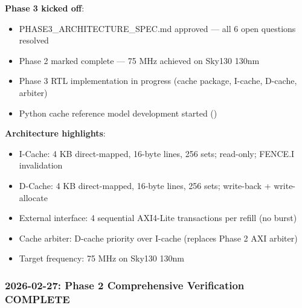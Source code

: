 \begin{record}

\textbf{Phase 3 kicked off}:

\begin{itemize}
\tightlist
\item
  \ok{} PHASE3\_\allowbreak{}ARCHITECTURE\_\allowbreak{}SPEC.md approved
  --- all 6 open questions resolved
\item
  \ok{} Phase 2 marked complete --- 75 MHz achieved on Sky130 130nm
\item
  \wip{} Phase 3 RTL implementation in progress (cache package, I-cache,
  D-cache, arbiter)
\item
  \wip{} Python cache reference model development started
  ()
\end{itemize}

\textbf{Architecture highlights}:

\begin{itemize}
\tightlist
\item
  I-Cache: 4 KB direct-mapped, 16-byte lines, 256 sets; read-only;
  FENCE.I invalidation
\item
  D-Cache: 4 KB direct-mapped, 16-byte lines, 256 sets; write-back +
  write-allocate
\item
  External interface: 4 sequential AXI4-Lite transactions per refill (no
  burst)
\item
  Cache arbiter: D-cache priority over I-cache (replaces Phase 2 AXI
  arbiter)
\item
  Target frequency: 75 MHz on Sky130 130nm
\end{itemize}

\end{record}

\subsubsection{2026-02-27: Phase 2 Comprehensive Verification COMPLETE}\label{cr:status:phase-status:2026-02-27-phase-2-comprehensive-verification-complete}

